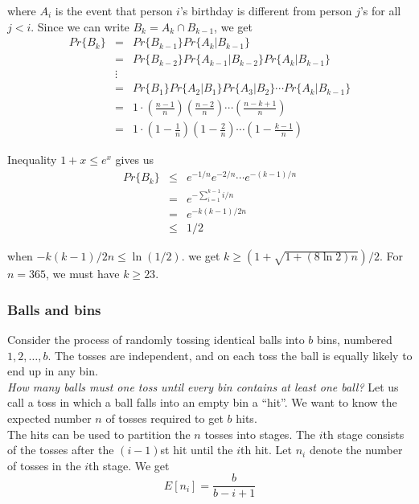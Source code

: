 \documentclass[12pt]{article}
\begin{document}
where $A_i$ is the event that person $i$'s birthday is different from person $j$'s for all $j < i$. Since we can write $B_k = A_k \cap B_{k-1}$, we get
\begin{eqnarray*}
  Pr \{ B_k \} 
  &=& Pr \{ B_{k-1} \} Pr \{ A_k | B_{k-1} \} \\
  &=& Pr \{ B_{k-2} \} Pr \{ A_{k-1} | B_{k-2} \} Pr \{ A_{k} | B_{k-1} \} \\
  &\vdots& \\
  &=& Pr \{ B_{1} \} Pr \{ A_{2} | B_{1} \} Pr \{ A_{3} | B_{2} \} \cdots
      Pr \{ A_{k} | B_{k-1} \} \\
  &=& 1 \cdot \left( \frac {n-1}{n} \right) \left( \frac {n-2}{n} \right)
      \cdots \left( \frac {n-k+1}{n} \right) \\
  &=& 1 \cdot \left( 1 - \frac {1}{n} \right) \left( 1 - \frac {2}{n} \right)
      \cdots \left( 1 - \frac {k-1}{n} \right)
\end{eqnarray*}

Inequality $1 + x \le e^x$ gives us
\begin{eqnarray*}
  Pr \{ B_k \} 
  &\le& e^{-1/n} e^{-2/n} \cdots e^{-(k-1)/n} \\
  &=& e^{- \sum_{i=1}^{k-1} i/n} \\
  &=& e^{-k(k-1)/2n} \\
  &\le& 1/2
\end{eqnarray*}

when $-k(k-1)/2n \le \ln(1/2)$. we get $k \ge (1 + \sqrt {1 + (8 \ln 2)n})/2$. For $n = 365$, we must have $k \ge 23$.

\subsubsection{Balls and bins}

Consider the process of randomly tossing identical balls into $b$ bins, numbered $1, 2, \dots, b$. The tosses are independent, and on each toss the ball is equally likely to end up in any bin. \\

\emph{How many balls must one toss until every bin contains at least one ball?} Let us call a toss in which a ball falls into an empty bin a ``hit''. We want to know the expected number $n$ of tosses required to get $b$ hits. \\

The hits can be used to partition the $n$ tosses into stages. The $i$th stage consists of the tosses after the $(i-1)$st hit until the $i$th hit. Let $n_i$ denote the number of tosses in the $i$th stage. We get
\begin{equation*}
  E[n_i] = \frac {b}{b - i + 1}
\end{equation*}
\end{document}
